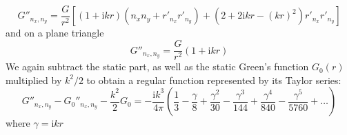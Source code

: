 \documentclass[a4paper,11pt]{article}
\newcommand{\ti}{\mathrm{i}}
\begin{document}
\begin{equation}
G''_{n_x, n_y} = \frac{G}{r^2} \left[ 
\left(1+\ti k r\right)\left(n_x n_y + r'_{n_x} r'_{n_y}\right) 
 + \left(2 + 2 \ti k r - (kr)^2\right) r'_{n_x} r'_{n_y}
\right]
\end{equation}
%
and on a plane triangle
%
\begin{equation}
G''_{n_x, n_y} = \frac{G}{r^2} \left(1+\ti k r\right)
\end{equation}
%
We again subtract the static part, as well as the static Green's function $G_0(r)$ multiplied by $k^2/2$ to obtain a regular function represented by its Taylor series:
%
\begin{equation}
G''_{n_x, n_y} - {G_0}''_{n_x, n_y} - \frac{k^2}{2} G_0 =
-\frac{\ti k^3}{4\pi}
\left(
\frac{1}{3}
- \frac\gamma{8} 
+ \frac{\gamma^2}{30} 
- \frac{\gamma^3}{144} 
+ \frac{\gamma^4}{840} 
-\frac{\gamma^5}{5760} 
+\dots
\right)
\end{equation}
%
where $\gamma = \ti k r$
\end{document}
